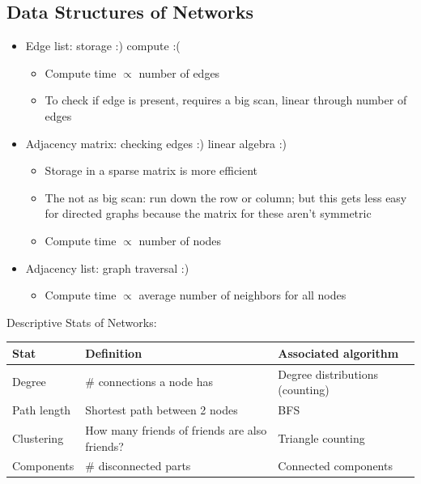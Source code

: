 \subsection{Data Structures of Networks}
\begin{itemize}
	\item Edge list: storage :) compute :(
    	\begin{itemize}
		\item Compute time $\propto$ number of edges     
		\item To check if edge is present, requires a big scan, linear through number of edges
  		\end{itemize} 
    \item Adjacency matrix: checking edges :) linear algebra :) 
    	\begin{itemize}
        \item Storage in a sparse matrix is more efficient
		\item The not as big scan: run down the row or column; but this gets less easy for directed graphs because the matrix for these aren't symmetric
        \item Compute time $\propto$ number of nodes  
  		\end{itemize} 
    \item Adjacency list: graph traversal :) 
    	\begin{itemize}
        \item Compute time $\propto$ average number of neighbors for all nodes
  		\end{itemize}     
\end{itemize}

Descriptive Stats of Networks: 
\begin{center}
    \begin{tabular}{| l | l | l |}
    \hline
    Stat & Definition & Associated algorithm \\ \hline
    Degree & \# connections a node has & Degree distributions (counting) \\ \hline
    Path length & Shortest path between 2 nodes & BFS \\ \hline
    Clustering & How many friends of friends are also friends? & Triangle counting \\ \hline
    Components & \# disconnected parts & Connected components \\
    \hline
    \end{tabular}
\end{center}

